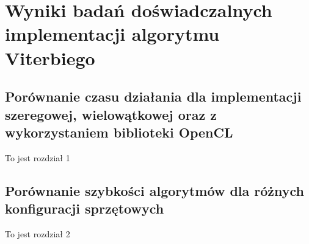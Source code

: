 \documentclass[document.tex]{subfiles}
\begin{document}
\chapter{Wyniki badań doświadczalnych implementacji algorytmu Viterbiego}
\section{Porównanie czasu działania dla implementacji szeregowej, wielowątkowej
oraz z wykorzystaniem biblioteki OpenCL}
To jest rozdział 1

\section{Porównanie szybkości algorytmów dla różnych konfiguracji sprzętowych}
To jest rozdział 2
\end{document}

